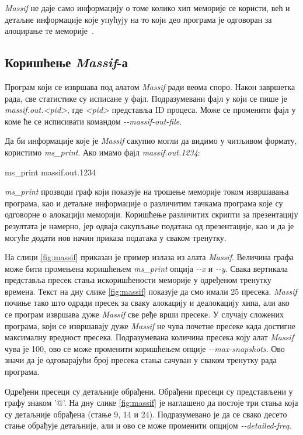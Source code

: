 \documentclass[12pt,oneside]{memoir}
\begin{document}
\indent \textit{Massif} не даје само информацију о томе колико хип меморије се користи, већ и детаљне информације које упућују на то који део програма је одговоран за алоцирање те меморије~\cite{massifdRef}.

\subsection{Коришћење \textit{Massif}-а}


\indent Програм који се извршава под алатом \textit{Massif} ради веома споро. Након завршетка рада, све статистике су исписане у фајл. Подразумевани фајл у који се пише је \textit{massif.out.<pid>}, где \textit{<pid>} представља ID процеса. Може се променити фајл у коме ће се исписивати командом \textit{-\--massif-out-file}.

\indent Да би информације које је \textit{Massif} сакупио могли да видимо у читљивом формату, користимо \textit{ms\_print}. Ако имамо фајл \textit{massif.out.1234}: 


\begin{center}
 ms\_print massif.out.1234
\end{center}

\indent \textit{ms\_print} прозводи граф који показује на трошење меморије током извршавања програма, као и детаљне информације о различитим тачкама програма које су одговорне о алокацији меморији. Коришћење различитих скрипти за презентацију резултата је намерно, јер одваја сакупљање података од презентације, као и да је могуће додати нов начин приказа података у сваком тренутку.

\indent На слици \ref{fig:massif} приказан је пример излаза из алата \textit{Massif}. Величина графа може бити промењена коришћењем \textit{ms\_print} опција \textit{-\--x} и \textit{-\--y}. Свака вертикала представља пресек стања искоришћености меморије у одређеном тренутку времена. Текст на дну слике \ref{fig:massif} показује да смо имали 25 пресека. \textit{Massif} почиње тако што одради пресек за сваку алокацију и деалокацију хипа, али ако се програм извршава дуже \textit{Massif} све ређе врши пресеке. У случају сложених програма, који се извршавају дуже \textit{Massif} не чува почетне пресеке када достигне максималну вредност пресека. Подразумевана количина пресека коју алат \textit{Massif} чува је 100, ово се може променити коришћењем опције \textit{-\--max-snapshots}. Ово значи да је одговарајући број пресека стања сачуван у сваком тренутку рада програма.

\indent Одређени пресеци су детаљније обрађени. Обрађени пресеци су представљени у графу знаком '@'. На дну слике \ref{fig:massif} је наглашено да постоје три стања која су детаљније обрађена (стање 9, 14 и 24). Подразумевано је да се свако десето стање обрађује детаљније, али и ово се може променити опцијом \textit{-\--detailed-freq}.
\end{document}
